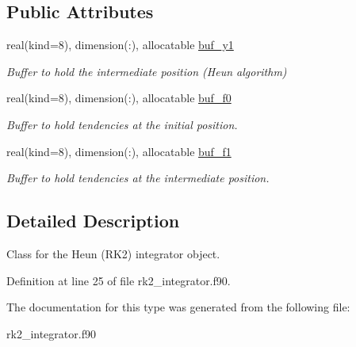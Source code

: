 \subsection*{Public Attributes}
\begin{DoxyCompactItemize}
\item 
\mbox{\label{structrk2__integrator_1_1rk2integrator_abbcdfd65bf66491ba32a5df23a7241f7}} 
real(kind=8), dimension(\+:), allocatable \hyperlink{structrk2__integrator_1_1rk2integrator_abbcdfd65bf66491ba32a5df23a7241f7}{buf\+\_\+y1}
\begin{DoxyCompactList}\small\item\em Buffer to hold the intermediate position (Heun algorithm) \end{DoxyCompactList}\item 
\mbox{\label{structrk2__integrator_1_1rk2integrator_a4b17658557f59d011a0fa185966d1c13}} 
real(kind=8), dimension(\+:), allocatable \hyperlink{structrk2__integrator_1_1rk2integrator_a4b17658557f59d011a0fa185966d1c13}{buf\+\_\+f0}
\begin{DoxyCompactList}\small\item\em Buffer to hold tendencies at the initial position. \end{DoxyCompactList}\item 
\mbox{\label{structrk2__integrator_1_1rk2integrator_a2daeb0252fa03949b85cff88f3d1c8ce}} 
real(kind=8), dimension(\+:), allocatable \hyperlink{structrk2__integrator_1_1rk2integrator_a2daeb0252fa03949b85cff88f3d1c8ce}{buf\+\_\+f1}
\begin{DoxyCompactList}\small\item\em Buffer to hold tendencies at the intermediate position. \end{DoxyCompactList}\end{DoxyCompactItemize}


\subsection{Detailed Description}
Class for the Heun (R\+K2) integrator object. 

Definition at line 25 of file rk2\+\_\+integrator.\+f90.



The documentation for this type was generated from the following file\+:\begin{DoxyCompactItemize}
\item 
rk2\+\_\+integrator.\+f90\end{DoxyCompactItemize}
